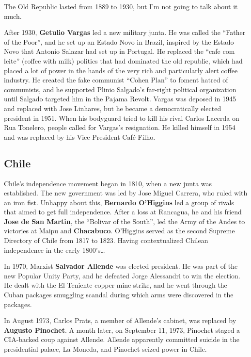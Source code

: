 The Old Republic lasted from 1889 to 1930, but I'm not going to talk about it much.

After 1930, \textbf{Getulio Vargas} led a new military junta.
He was called the ``Father of the Poor'', and he set up an Estado Novo in Brazil,
inspired by the Estado Novo that Antonio Salazar had set up in Portugal.
He replaced the ``cafe com leite'' (coffee with milk) politics that had dominated the old republic,
which had placed a lot of power in the hands of the very rich and particularly alert coffee industry.
He created the fake communist ``Cohen Plan'' to foment hatred of communists,
and he supported Plinio Salgado's far-right political organization until Salgado targeted him in the Pajama Revolt.
Vargas was deposed in 1945 and replaced with Jose Linhares,
but he became a democratically elected president in 1951.
When his bodyguard tried to kill his rival Carlos Lacerda on Rua Tonelero, people called for Vargas's resignation.
He killed himself in 1954 and was replaced by his Vice President Caf\'e Filho.

\subsection*{Chile}

Chile's independence movement began in 1810, when a new junta was established.
The new government was led by Jose Miguel Carrera, who ruled with an iron fist.
Unhappy about this, \textbf{Bernardo O'Higgins} led a group of rivals that aimed to get full independence.
After a loss at Rancagua, he and his friend \textbf{Jose de San Martin}, the ``Bolivar of the South'',
led the Army of the Andes to victories at Maipu and \textbf{Chacabuco}.
O'Higgins served as the second Supreme Directory of Chile from 1817 to 1823.
Having contextualized Chilean independence in the early 1800's\ldots{}

In 1970, Marxist \textbf{Salvador Allende} was elected president.
He was part of the new Popular Unity Party, and he defeated Jorge Alessandri to win the election.
He dealt with the El Teniente copper mine strike,
and he went through the Cuban packages smuggling scandal during which arms were discovered in the packages.

In August 1973, Carlos Prats, a member of Allende's cabinet, was replaced by \textbf{Augusto Pinochet}.
A month later, on September 11, 1973, Pinochet staged a CIA-backed coup against Allende.
Allende apparently committed suicide in the presidential palace, La Moneda,
and Pinochet seized power in Chile.

